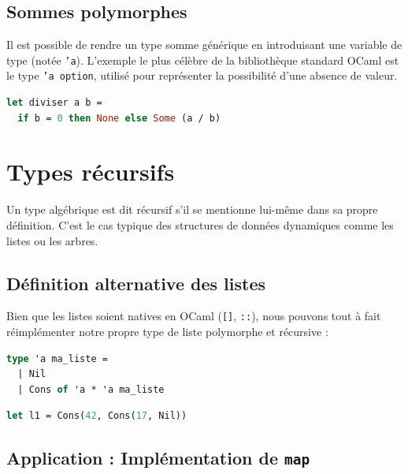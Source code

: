 \documentclass{article}
\begin{document}
\subsection{Sommes polymorphes}

Il est possible de rendre un type somme générique en introduisant une variable de type (notée \texttt{'a}). L'exemple le plus célèbre de la bibliothèque standard OCaml est le type \texttt{'a option}, utilisé pour représenter la possibilité d'une absence de valeur.

\begin{lstlisting}[language=Caml]
let diviser a b =
  if b = 0 then None else Some (a / b)
\end{lstlisting}

\section{Types récursifs}

Un type algébrique est dit récursif s'il se mentionne lui-même dans sa propre définition. C'est le cas typique des structures de données dynamiques comme les listes ou les arbres.

\subsection{Définition alternative des listes}

Bien que les listes soient natives en OCaml (\texttt{[]}, \texttt{::}), nous pouvons tout à fait réimplémenter notre propre type de liste polymorphe et récursive :

\begin{lstlisting}[language=Caml]
type 'a ma_liste =
  | Nil
  | Cons of 'a * 'a ma_liste
\end{lstlisting}

\begin{lstlisting}[language=Caml]
let l1 = Cons(42, Cons(17, Nil))
\end{lstlisting}

\subsection{Application : Implémentation de \texttt{map}}
\end{document}
